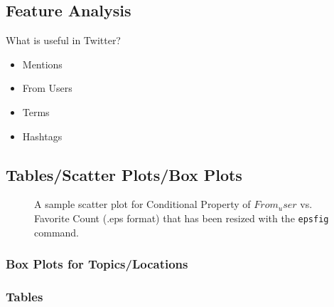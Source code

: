 \documentclass{acm_proc_article-sp}
\begin{document}
\subsection{Feature Analysis}
What is useful in Twitter?
\begin{itemize}
\item Mentions 
\item From Users
\item Terms
\item Hashtags
\end{itemize}

\subsection{Tables/Scatter Plots/Box Plots}



\begin{figure}
\centering
{}
\caption{A sample scatter plot for Conditional Property of $From_user$ vs. Favorite Count (.eps format)
that has been resized with the \texttt{epsfig} command.}
\end{figure}

\subsubsection{Box Plots for Topics/Locations}

\subsubsection{Tables}

\end{document}
